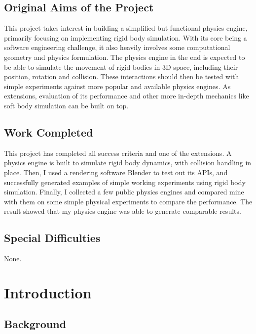 \documentclass[12pt,a4paper,twoside,openright]{report}
\begin{document}
\section*{Original Aims of the Project}

This project takes interest in building a simplified but functional physics engine, primarily focusing on implementing rigid body simulation. With its core being a software engineering challenge, it also heavily involves some computational geometry and physics formulation. The physics engine in the end is expected to be able to simulate the movement of rigid bodies in 3D space, including their position, rotation and collision. These interactions should then be tested with simple experiments against more popular and available physics engines. As extensions, evaluation of its performance and other more in-depth mechanics like soft body simulation can be built on top.

\section*{Work Completed}

This project has completed all success criteria and one of the extensions. A physics engine is built to simulate rigid body dynamics, with collision handling in place. Then, I used a rendering software Blender to test out its APIs, and successfully generated examples of simple working experiments using rigid body simulation. Finally, I collected a few public physics engines and compared mine with them on some simple physical experiments to compare the performance. The result showed that my physics engine was able to generate comparable results.

\section*{Special Difficulties}

None.

\newpage

\tableofcontents
\newpage

\pagestyle{headings}

\chapter{Introduction}

\section{Background}
\end{document}
